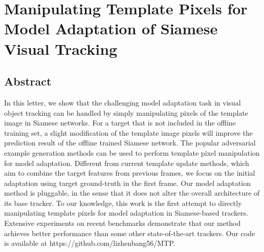 \chapter{Manipulating Template Pixels for Model Adaptation of Siamese Visual Tracking}\label{chap:MTP}

\section{Abstract}
In this letter, we show that the challenging model adaptation task in visual object tracking can be handled by simply manipulating pixels of the template image in Siamese networks. For a target that is not included in the offline training set, a slight modification of the template image pixels will improve the prediction result of the offline trained Siamese network. The popular adversarial example generation methods can be used to perform template pixel manipulation for model adaptation. Different from current template update methods, which aim to combine the target features from previous frames, we focus on the initial adaptation using target ground-truth in the first frame. Our model adaptation method is pluggable, in the sense that it does not alter the overall architecture of its base tracker. To our knowledge, this work is the first attempt to directly manipulating template pixels for model adaptation in Siamese-based trackers. Extensive experiments on recent benchmarks demonstrate that our method achieves better performance than some other state-of-the-art trackers. Our code is available at https://github.com/lizhenbang56/MTP.

